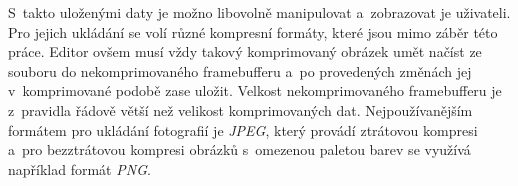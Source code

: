 \documentclass[11pt, a4paper, titlepage]{article}
\renewcommand{\uv}[1]{``#1''}
\begin{document}
S~takto uloženými daty je možno libovolně manipulovat a~zobrazovat je uživateli.
Pro jejich ukládání se volí různé kompresní formáty, které jsou mimo záběr této práce.
Editor ovšem musí vždy takový komprimovaný obrázek umět načíst ze souboru do nekomprimovaného framebufferu a~po provedených změnách jej v~komprimované podobě zase uložit. Velkost nekomprimovaného  framebufferu je z~pravidla řádově větší než velikost komprimovaných dat.
Nejpoužívanějším formátem pro ukládání fotografií je \emph{JPEG}, který provádí ztrátovou kompresi a~pro bezztrátovou kompresi obrázků s~omezenou paletou barev se využívá například formát \emph{PNG}.


\end{document}
